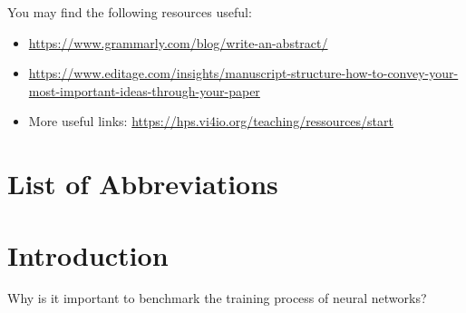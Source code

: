 \documentclass[12pt, a4paper, hidelinks]{article}
\begin{document}
You may find the following resources useful:
\begin{itemize}
    \item \url{https://www.grammarly.com/blog/write-an-abstract/}
    \item \url{https://www.editage.com/insights/manuscript-structure-how-to-convey-your-most-important-ideas-through-your-paper}
    \item More useful links: \url{https://hps.vi4io.org/teaching/ressources/start}
\end{itemize}
\fi

\newpage


\clearpage
{}
\tableofcontents

\newpage
\clearpage{}
\listoftables
{}
\listoffigures
{}
\listoflistings {}

\newpage

\section*{List of Abbreviations} 
\begin{acronym}[Bash] %
\end{acronym}

\thispagestyle{plain}
\newpage


\setcounter{page}{1}
\pagestyle{fancy}


\section{Introduction}

\iffalse
Why is it important to benchmark the training process of neural networks?
\end{document}
